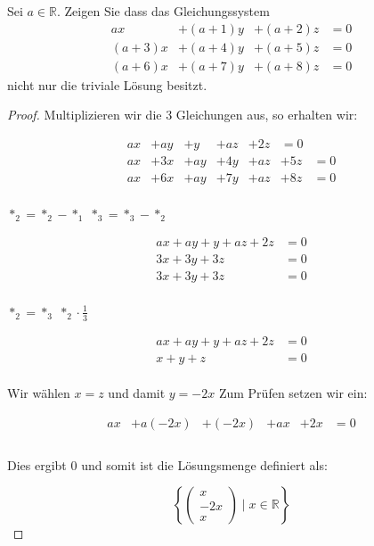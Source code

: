 \documentclass[12pt, letterpaper]{article}
\begin{document}
Sei $a \in \mathbb{R}$. Zeigen Sie dass das Gleichungssystem
\[
\begin{aligned}
    ax &+ (a + 1)y &+ (a + 2)z &= 0 \\
    (a + 3)x &+ (a + 4)y &+ (a + 5)z &= 0 \\
    (a + 6)x &+ (a + 7)y &+ (a + 8)z &= 0
\end{aligned}
\]
nicht nur die triviale Lösung besitzt.

\begin{proof}

Multiplizieren wir die 3 Gleichungen aus, so erhalten wir:

\[
\begin{aligned}
    ax &+ ay &+ y &+ az &+ 2z &= 0 \\
    ax &+ 3x &+ ay &+ 4y &+ az &+ 5z &= 0 \\
    ax &+ 6x &+ ay &+7y &+ az &+ 8z &= 0
\end{aligned}
\]\\

\noindent $\ast_2 = \ast_2 - \ast_1$\newline
\noindent $\ast_3 = \ast_3 - \ast_2$

\[
\begin{aligned}
    ax + ay + y + az + 2z &= 0 \\
    3x + 3y + 3z &= 0 \\
    3x + 3y + 3z &= 0
\end{aligned}
\]\\

\noindent $\ast_2 = \ast_3$\newline
\noindent $\ast_2 \cdot \frac{1}{3}$

\[
\begin{aligned}
    ax + ay + y + az + 2z &= 0 \\
    x + y + z &= 0
\end{aligned}
\]\\

\noindent Wir wählen $x = z$ und damit $y = -2x$\newline
\noindent Zum Prüfen setzen wir ein:

\[
\begin{aligned}
    ax &+ a(-2x) &+ (-2x) &+ ax &+ 2x &= 0 \\
\end{aligned}
\]\\

\noindent Dies ergibt 0 und somit ist die Lösungsmenge definiert als:

\[
\left\{ \begin{pmatrix} x \\ -2x \\ x \end{pmatrix} \mid x \in \mathbb{R} \right\}
\]

\end{proof}
\end{document}
